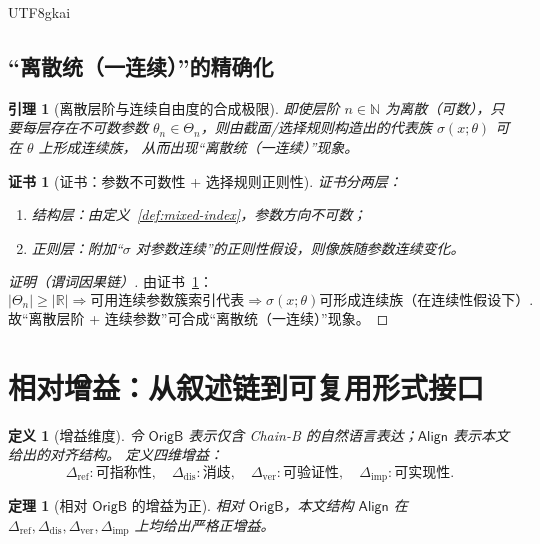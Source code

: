 \documentclass[12pt]{article}
\newtheorem{definition}{定义}[section]
\newtheorem{theorem}{定理}[section]
\newtheorem{lemma}{引理}[section]
\newtheorem{Certificate}{证书}[section]
\begin{document}
\begin{CJK*}{UTF8}{gkai}
\subsection{“离散统（一连续）”的精确化}

\begin{lemma}[离散层阶与连续自由度的合成极限]\label{lem:discrete-continuous}
即使层阶 $n\in\mathbb N$ 为离散（可数），只要每层存在不可数参数 $\theta_n\in\Theta_n$，则由截面/选择规则构造出的代表族 $\sigma(x;\theta)$ 可在 $\theta$ 上形成连续族，
  从而出现“离散统（一连续）”现象。
\end{lemma}

\begin{Certificate}[证书：参数不可数性 + 选择规则正则性]\label{cert:discrete-continuous}
证书分两层：
\begin{enumerate}
\item 结构层：由定义~\ref{def:mixed-index}，参数方向不可数；
\item 正则层：附加“$\sigma$ 对参数连续”的正则性假设，则像族随参数连续变化。
\end{enumerate}
\end{Certificate}

\begin{proof}[证明（谓词因果链）]
由证书~\ref{cert:discrete-continuous}：
\[
|\Theta_n|\ge|\mathbb R|
\Rightarrow
\text{可用连续参数簇索引代表}
\Rightarrow
\sigma(x;\theta)
\text{可形成连续族（在连续性假设下）}.
\]
故“离散层阶 + 连续参数”可合成“离散统（一连续）”现象。
\end{proof}

\section{相对增益：从叙述链到可复用形式接口}

\begin{definition}[增益维度]\label{def:gain-metrics}
令 $\mathsf{OrigB}$ 表示仅含 Chain-B 的自然语言表达；$\mathsf{Align}$ 表示本文给出的对齐结构。
定义四维增益：
\[
\Delta_{\mathrm{ref}}:\text{可指称性},\quad
\Delta_{\mathrm{dis}}:\text{消歧},\quad
\Delta_{\mathrm{ver}}:\text{可验证性},\quad
\Delta_{\mathrm{imp}}:\text{可实现性}.
\]
\end{definition}

\begin{theorem}[相对 $\mathsf{OrigB}$ 的增益为正]\label{thm:gain-positive}
相对 $\mathsf{OrigB}$，本文结构 $\mathsf{Align}$ 在
\(
\Delta_{\mathrm{ref}},\Delta_{\mathrm{dis}},\Delta_{\mathrm{ver}},\Delta_{\mathrm{imp}}
\)
上均给出严格正增益。
\end{theorem}


\end{CJK*}
\end{document}
